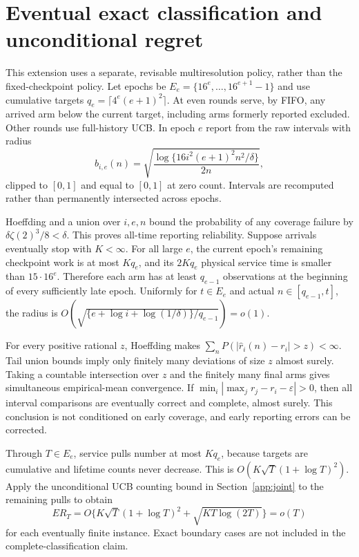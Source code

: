 \section{Eventual exact classification and unconditional regret}
\label{app:consistency}

This extension uses a separate, revisable multiresolution policy, rather
than the fixed-checkpoint policy. Let epochs be $E_e=\{16^e,\ldots,16^{e+1}-1\}$ and use cumulative targets
$q_e=\lceil4^e(e+1)^2\rceil$. At even rounds serve, by FIFO, any arrived
arm below the current target, including arms formerly reported excluded.
Other rounds use full-history UCB. In epoch $e$ report from the raw intervals
with radius
\[
 b_{i,e}(n)=\sqrt{\frac{\log\{16i^2(e+1)^2n^2/\delta\}}{2n}},
\]
clipped to $[0,1]$ and equal to $[0,1]$ at zero count. Intervals are
recomputed rather than permanently intersected across epochs.

Hoeffding and a union over $i,e,n$ bound the probability of any coverage
failure by $\delta\zeta(2)^3/8<\delta$. This proves all-time reporting
reliability. Suppose arrivals eventually stop with $K<\infty$. For all large
$e$, the current epoch's remaining checkpoint work is at most $Kq_e$, and
its $2Kq_e$ physical service time is smaller than $15\cdot16^e$. Therefore
each arm has at least $q_{e-1}$ observations at the beginning of every
sufficiently late epoch. Uniformly for $t\in E_e$ and actual
$n\in[q_{e-1},t]$, the radius is
$O(\sqrt{\{e+\log i+\log(1/\delta)\}/q_{e-1}})=o(1)$.

For every positive rational $z$, Hoeffding makes
$\sum_nP(|\hat r_i(n)-r_i|>z)<\infty$. Tail union bounds imply only
finitely many deviations of size $z$ almost surely. Taking a countable
intersection over $z$ and the finitely many final arms gives simultaneous
empirical-mean convergence. If
$\min_i|\max_jr_j-r_i-\varepsilon|>0$, then all interval comparisons
are eventually correct and complete, almost surely. This conclusion is not
conditioned on early coverage, and early reporting errors can be corrected.

Through $T\in E_e$, service pulls number at most $Kq_e$, because targets are
cumulative and lifetime counts never decrease. This is
$O(K\sqrt T(1+\log T)^2)$. Apply the unconditional UCB counting bound in Section~\ref{app:joint} to
the remaining pulls to obtain
\[
 ER_T=O\{K\sqrt T(1+\log T)^2+\sqrt{KT\log(2T)}\}=o(T)
\]
for each eventually finite instance. Exact boundary cases are not included
in the complete-classification claim.
